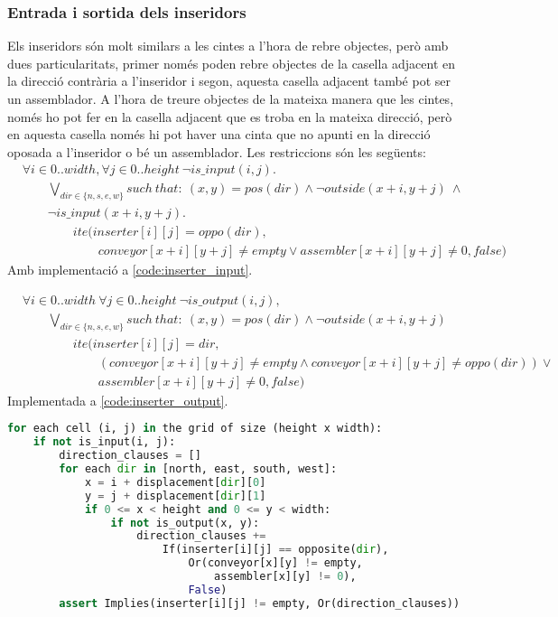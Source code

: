 \subsubsection{Entrada i sortida dels inseridors}
Els inseridors són molt similars a les cintes a l'hora de rebre objectes, però amb dues particularitats, primer només poden rebre objectes de la casella adjacent en la direcció contrària a l'inseridor i segon, aquesta casella adjacent també pot ser un assemblador. A l'hora de treure objectes de la mateixa manera que les cintes, només ho pot fer en la casella adjacent que es troba en la mateixa direcció, però en aquesta casella només hi pot haver una cinta que no apunti en la direcció oposada a l'inseridor o bé un assemblador. Les restriccions són les següents:
\begin{align*}
    & \forall i \in 0..width, \forall j \in 0..height \ \neg is\_input(i, j).\\
    & \qquad \bigvee_{dir \in \{n, s, e, w\}}such \ that: \ (x, y)=pos(dir) \land \neg outside(x+i, y+j) \ \land\\
    & \qquad \neg is\_input(x+i, y+j).\\
    & \qquad \qquad ite\Big(inserter[i][j]=oppo(dir),\\
    & \qquad \qquad \qquad conveyor[x+i][y+j]\neq empty \lor assembler[x+i][y+j]\neq 0, false\Big)
\end{align*}
Amb implementació a \ref{code:inserter_input}.

\begin{align*}
    & \forall i \in 0..width \ \forall j \in 0..height \ \neg is\_output(i, j),\\
    & \qquad \bigvee_{dir \in \{n, s, e, w\}} such \ that: \ (x, y)=pos(dir) \land \neg outside(x+i, y+j)\\
    & \qquad \qquad ite\Big(inserter[i][j]=dir,\\
    & \qquad \qquad \qquad (conveyor[x+i][y+j]\neq empty \land conveyor[x+i][y+j]\neq oppo(dir)) \lor\\
    & \qquad \qquad \qquad assembler[x+i][y+j]\neq 0,false\Big)
\end{align*}
Implementada a \ref{code:inserter_output}.
\begin{lstlisting}[language=Python, caption=Inserter Input, label=code:inserter_input]
for each cell (i, j) in the grid of size (height x width):
    if not is_input(i, j):
        direction_clauses = []
        for each dir in [north, east, south, west]:
            x = i + displacement[dir][0]
            y = j + displacement[dir][1]
            if 0 <= x < height and 0 <= y < width:
                if not is_output(x, y):
                    direction_clauses += 
                        If(inserter[i][j] == opposite(dir),
                            Or(conveyor[x][y] != empty,
                                assembler[x][y] != 0),
                            False)
        assert Implies(inserter[i][j] != empty, Or(direction_clauses))
\end{lstlisting}

